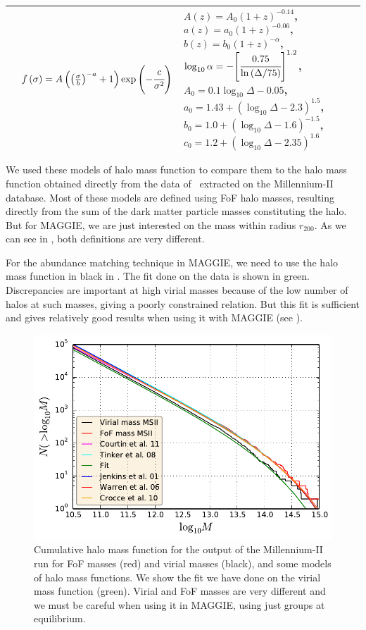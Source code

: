 \begin{table}[htb]
\begin{tabular}{cp{6.5cm}p{5cm}}
        \citet{Tinker+08} &
        $f\left(\sigma\right)=
        A\left({\left(\frac{\sigma}{b}\right)}^{-a}+1\right)
        \exp\left(-\cfrac{c}{\sigma^2}\right)$ &
        $A\left(z\right)=A_0{\left(1+z\right)}^{-0.14}$,\newline
        $a\left(z\right)=a_0{\left(1+z\right)}^{-0.06}$,\newline
        $b\left(z\right)=b_0{\left(1+z\right)}^{-\alpha}$,\newline
        $\log_{10}\alpha=
        -{\left[\cfrac{0.75}{\ln\left(\Delta/75\right)}\right]}^{1.2}$,\newline
        $A_0=0.1\log_{10}\Delta-0.05$,\newline
        $a_0=1.43+{\left(\log_{10}\Delta-2.3\right)}^{1.5}$,\newline
        $b_0=1.0+{\left(\log_{10}\Delta-1.6\right)}^{-1.5}$,\newline
        $c_0=1.2+{\left(\log_{10}\Delta-2.35\right)}^{1.6}$ \\
        \bottomrule
    \end{tabular}
\end{table}

We used these models of halo mass function to compare them to the halo mass
function obtained directly from the data of~\cite{BoylanKolchin+09} extracted
on the Millennium-II database. Most of these models are defined using FoF halo
masses, resulting directly from the sum of the dark matter particle masses
constituting the halo. But for MAGGIE, we are just interested on the mass
within radius $r_{200}$. As we can see in , both definitions
are very different.

For the abundance matching technique in MAGGIE, we need to use the halo mass
function in black in . The fit done on the data is shown in
green. Discrepancies are important at high virial masses because of the low
number of halos at such masses, giving a poorly constrained relation. But this
fit is sufficient and gives relatively good results when using it with MAGGIE
(see ).
%
\begin{figure}[htb]
    \centering
    \includegraphics[width=0.6\linewidth]{figures/hmf/hmf.pdf}
    \caption{Cumulative halo mass function for the output of the Millennium-II
        run for FoF masses (red) and virial masses (black), and some models of
        halo mass functions. We show the fit we have done on the virial mass
        function (green). Virial and FoF masses are very different and we must
        be careful when using it in MAGGIE, using just groups at
    equilibrium.\label{fig:hmf}}
\end{figure}

